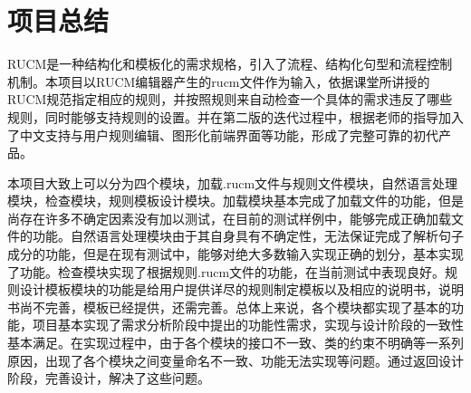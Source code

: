 \chapter{项目总结}

RUCM是一种结构化和模板化的需求规格，引入了流程、结构化句型和流程控制机制。本项目以RUCM编辑器产生的rucm文件作为输入，依据课堂所讲授的RUCM规范指定相应的规则，并按照规则来自动检查一个具体的需求违反了哪些规则，同时能够支持规则的设置。并在第二版的迭代过程中，根据老师的指导加入了中文支持与用户规则编辑、图形化前端界面等功能，形成了完整可靠的初代产品。


本项目大致上可以分为四个模块，加载.rucm文件与规则文件模块，自然语言处理模块，检查模块，规则模板设计模块。加载模块基本完成了加载文件的功能，但是尚存在许多不确定因素没有加以测试，在目前的测试样例中，能够完成正确加载文件的功能。自然语言处理模块由于其自身具有不确定性，无法保证完成了解析句子成分的功能，但是在现有测试中，能够对绝大多数输入实现正确的划分，基本实现了功能。检查模块实现了根据规则.rucm文件的功能，在当前测试中表现良好。规则设计模板模块的功能是给用户提供详尽的规则制定模板以及相应的说明书，说明书尚不完善，模板已经提供，还需完善。总体上来说，各个模块都实现了基本的功能，项目基本实现了需求分析阶段中提出的功能性需求，实现与设计阶段的一致性基本满足。在实现过程中，由于各个模块的接口不一致、类的约束不明确等一系列原因，出现了各个模块之间变量命名不一致、功能无法实现等问题。通过返回设计阶段，完善设计，解决了这些问题。